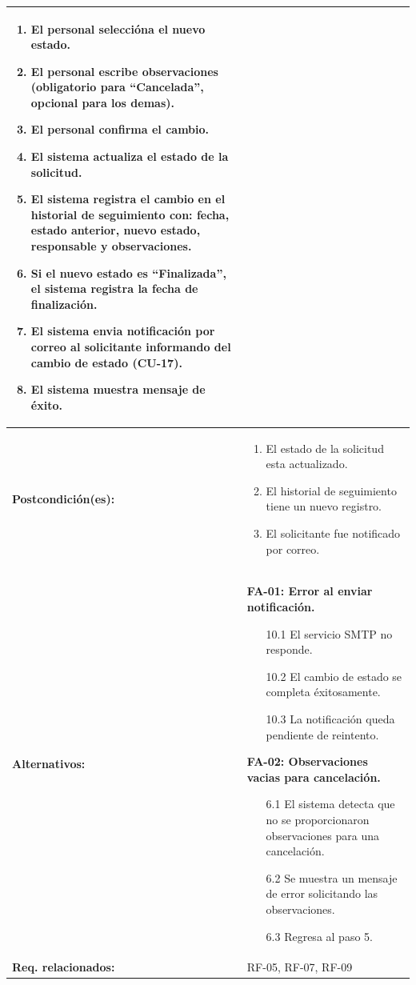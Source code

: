 \begin{longtable}{|L{4cm}|L{9.5cm}|}
\begin{enumerate}[nosep, leftmargin=*]
        \item El personal seleccióna el nuevo estado.
        \item El personal escribe observaciones (obligatorio para ``Cancelada'', opcional para los demas).
        \item El personal confirma el cambio.
        \item El sistema actualiza el estado de la solicitud.
        \item El sistema registra el cambio en el historial de seguimiento con: fecha, estado anterior, nuevo estado, responsable y observaciones.
        \item Si el nuevo estado es ``Finalizada'', el sistema registra la fecha de finalización.
        \item El sistema envia notificación por correo al solicitante informando del cambio de estado (CU-17).
        \item El sistema muestra mensaje de éxito.
    \end{enumerate} \\
    \hline
    \textbf{Postcondición(es):} &
    \begin{enumerate}[nosep, leftmargin=*]
        \item El estado de la solicitud esta actualizado.
        \item El historial de seguimiento tiene un nuevo registro.
        \item El solicitante fue notificado por correo.
    \end{enumerate} \\
    \hline
    \textbf{Alternativos:} &
    \textbf{FA-01: Error al enviar notificación.}
    \begin{enumerate}[nosep, leftmargin=*]
        \item[10.1] El servicio SMTP no responde.
        \item[10.2] El cambio de estado se completa éxitosamente.
        \item[10.3] La notificación queda pendiente de reintento.
    \end{enumerate}
    \vspace{0.2cm}
    \textbf{FA-02: Observaciones vacias para cancelación.}
    \begin{enumerate}[nosep, leftmargin=*]
        \item[6.1] El sistema detecta que no se proporcionaron observaciones para una cancelación.
        \item[6.2] Se muestra un mensaje de error solicitando las observaciones.
        \item[6.3] Regresa al paso 5.
    \end{enumerate} \\
    \hline
    \textbf{Req. relacionados:} & RF-05, RF-07, RF-09 \\
    \hline
\end{longtable}

